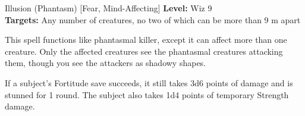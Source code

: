 {Illusion (Phantasm) [Fear, Mind-Affecting]}
{
	\textbf{Level:}
	Wiz 9\\
	\textbf{Targets:}
	Any number of creatures, no two of which can be more than 9 m apart\\
}
{
	This spell functions like phantasmal killer, except it can affect more than one creature. Only the affected creatures see the phantasmal creatures attacking them, though you see the attackers as shadowy shapes.

	If a subject's Fortitude save succeeds, it still takes 3d6 points of damage and is stunned for 1 round. The subject also takes 1d4 points of temporary Strength damage.

}
